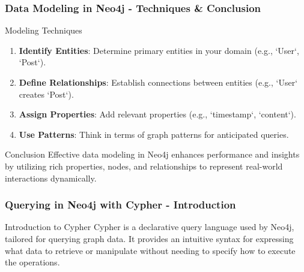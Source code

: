 \documentclass[aspectratio=169]{beamer}
\begin{document}
\begin{frame}[fragile]
    \frametitle{Data Modeling in Neo4j - Techniques & Conclusion}
    \begin{block}{Modeling Techniques}
        \begin{enumerate}
            \item \textbf{Identify Entities}: Determine primary entities in your domain (e.g., `User`, `Post`).
            
            \item \textbf{Define Relationships}: Establish connections between entities (e.g., `User` creates `Post`).
            
            \item \textbf{Assign Properties}: Add relevant properties (e.g., `timestamp`, `content`).
            
            \item \textbf{Use Patterns}: Think in terms of graph patterns for anticipated queries.
        \end{enumerate}
    \end{block}
    
    \begin{block}{Conclusion}
        Effective data modeling in Neo4j enhances performance and insights by utilizing rich properties, nodes, and relationships to represent real-world interactions dynamically.
    \end{block}
\end{frame}

\begin{frame}[fragile]
    \frametitle{Querying in Neo4j with Cypher - Introduction}
    \begin{block}{Introduction to Cypher}
        Cypher is a declarative query language used by Neo4j, tailored for querying graph data. 
        It provides an intuitive syntax for expressing what data to retrieve or manipulate without needing to specify how to execute the operations.
    \end{block}
\end{frame}
\end{document}
